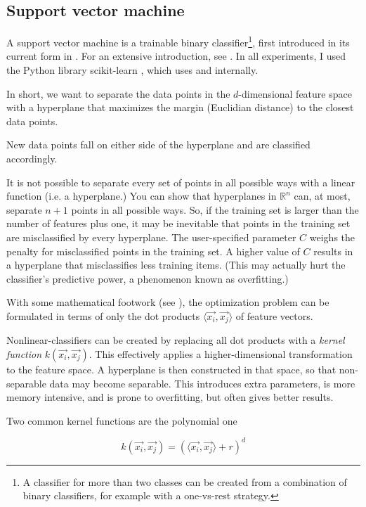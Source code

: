 \subsection{Support vector machine}

A support vector machine is a trainable binary classifier\footnote{A
classifier for more than two classes can be created from a combination of
binary classifiers, for example with a one-vs-rest strategy.}, first introduced in its current form in
\cite{Cortes1995}. For an extensive introduction, see \cite{Burges1998}.
In all experiments, I used the Python library scikit-learn
\cite{Pedregosa2011}, which uses \cite{Fan2014} and \cite{Chang2011}
internally.

In short, we want to separate the data points in the $d$-dimensional
feature space with a hyperplane that maximizes the margin (Euclidian
distance) to the closest data points. 

New data points fall on either side of the hyperplane and are classified
accordingly.

It is not possible to separate every set of points in all possible ways
with a linear function (i.e. a hyperplane.) You can show that hyperplanes
in $\mathbb{R}^{n}$ can, at most, separate $n + 1$ points in all possible
ways. So, if the training set is larger than the number of features plus
one, it may be inevitable that points in the training set are
misclassified by every hyperplane. The user-specified parameter $C$ weighs
the penalty for misclassified points in the training set. A higher value
of $C$ results in a hyperplane that misclassifies less training items.
(This may actually hurt the classifier's predictive power, a phenomenon
known as overfitting.) 

With some mathematical footwork (see \cite{Burges1998}), the optimization
problem can be formulated in terms of only the dot products $\langle
\vec{x_{i}}, \vec{x_{j}} \rangle$ of feature vectors. 

Nonlinear-classifiers can be created by replacing all dot products with
a \emph{kernel function} $k(\vec{x_{i}}, \vec{x_{j}})$. This effectively
applies a higher-dimensional transformation to the feature space.
A hyperplane is then constructed in that space, so that
non-separable data may become separable. This introduces extra parameters,
is more memory intensive, and is prone to overfitting, but often gives
better results.

Two common kernel functions are the polynomial one

$$ k(\vec{x_{i}}, \vec{x_{j}}) = ( \langle \vec{x_{i}}, \vec{x_{j}}
\rangle + r )^{d} $$

